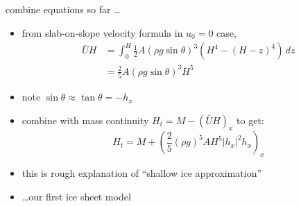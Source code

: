 \begin{frame}{combine equations so far \dots}

\begin{itemize}
\item from slab-on-slope velocity formula in $u_0=0$ case,
\begin{align*}
\bar U H &= \int_0^H \frac{1}{2} A (\rho g \sin\theta)^3  \left(H^4 - (H-z)^4\right)\,dz \\
	&= \frac{2}{5} A (\rho g \sin\theta)^3 H^5
\end{align*}
\item note $\sin \theta \approx \tan\theta = - h_x$
\item combine with mass continuity $H_t = M - \left(\bar U H\right)_x$ to get:
  $$H_t = M + \left(\frac{2}{5} (\rho g)^5 A H^5 |h_x|^2 h_x\right)_x$$

\medskip
\item this is rough explanation of ``shallow ice approximation''
\item \dots our first ice sheet model
\end{itemize}
\end{frame}